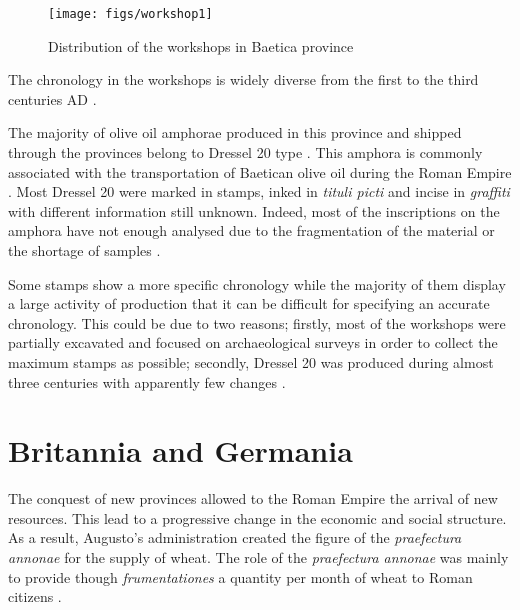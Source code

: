 \documentclass[review]{elsarticle}
\newcommand{\memo}[2]{\textcolor{#1}{#2}}
\newcommand{\xavi}[1]{\memo{magenta}{XRC: #1\\}}
\begin{document}
\begin{figure}[htp]
	\centering
\texttt{[image: figs/workshop1]}
\caption{Distribution of the workshops in Baetica province}
\label{workshop}
\end{figure} 


The chronology in the workshops is widely diverse from the first to the third centuries AD \citep{millet_anforas_1998,rodriguez_baetican_1998,chic2005comercio}. 

The majority of olive oil amphorae produced in this province and shipped through the provinces belong to Dressel 20 type \citep{dressel_ricerche_1878,
millet_anforas_1998}. This amphora is commonly associated with the transportation of Baetican olive oil during the Roman Empire \citep{berni_millet_epigrafianforica_2008}. Most Dressel 20 were marked in stamps, inked in \textit{tituli picti} and incise in \textit{graffiti} with different information still unknown. Indeed, most of the inscriptions on the amphora have not enough analysed due to the fragmentation of the material or the shortage of samples \citep{aguilera_evolucion_2007,rovira_guardiola_grafitos_2007}. 


Some stamps show a more specific chronology while the majority of them display a large activity of production that it can be difficult for specifying an accurate chronology. This could be due to two reasons; firstly, most of the workshops were partially excavated and focused on archaeological surveys in order to collect the maximum stamps as possible; secondly, Dressel 20 was produced during almost three centuries with apparently few changes \citep{berni_piero_chapter_2017}.

\section{Britannia and Germania}



The conquest of new provinces allowed to the Roman Empire the arrival of new resources. This lead to a progressive change in the economic and social structure. As a result, Augusto's administration created the figure of the \textit{praefectura annonae} for the supply of wheat. The role of the \textit{praefectura annonae} was mainly to provide though \textit{frumentationes} a quantity per month of wheat to Roman citizens \citep{remesal_annona_1986,remesal_concierto}. 
\end{document}

